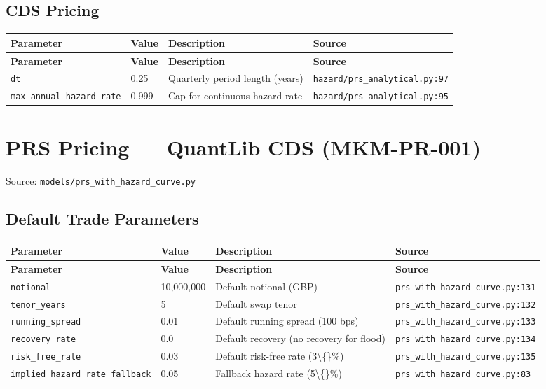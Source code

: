 \documentclass[11pt,a4paper]{article}
\begin{document}
\subsection{CDS Pricing}

\begin{longtable}{p{4cm}p{4cm}p{5.5cm}p{3.5cm}}
    \toprule
    \textbf{Parameter} & \textbf{Value} & \textbf{Description} & \textbf{Source} \\
    \midrule
    \endfirsthead
    \toprule
    \textbf{Parameter} & \textbf{Value} & \textbf{Description} & \textbf{Source} \\
    \midrule
    \endhead
    \bottomrule
    \endfoot
    \texttt{dt} & 0.25 & Quarterly period length (years) & {\scriptsize \texttt{hazard/prs\_analytical.py:97}} \\
    \texttt{max\_annual\_hazard\_rate} & 0.999 & Cap for continuous hazard rate & {\scriptsize \texttt{hazard/prs\_analytical.py:95}} \\
\end{longtable}

\clearpage

\section{PRS Pricing --- QuantLib CDS (MKM-PR-001)}

Source: \texttt{models/prs\_with\_hazard\_curve.py}

\subsection{Default Trade Parameters}

\begin{longtable}{p{4cm}p{4cm}p{5.5cm}p{3.5cm}}
    \toprule
    \textbf{Parameter} & \textbf{Value} & \textbf{Description} & \textbf{Source} \\
    \midrule
    \endfirsthead
    \toprule
    \textbf{Parameter} & \textbf{Value} & \textbf{Description} & \textbf{Source} \\
    \midrule
    \endhead
    \bottomrule
    \endfoot
    \texttt{notional} & 10,000,000 & Default notional (GBP) & {\scriptsize \texttt{prs\_with\_hazard\_curve.py:131}} \\
    \texttt{tenor\_years} & 5 & Default swap tenor & {\scriptsize \texttt{prs\_with\_hazard\_curve.py:132}} \\
    \texttt{running\_spread} & 0.01 & Default running spread (100 bps) & {\scriptsize \texttt{prs\_with\_hazard\_curve.py:133}} \\
    \texttt{recovery\_rate} & 0.0 & Default recovery (no recovery for flood) & {\scriptsize \texttt{prs\_with\_hazard\_curve.py:134}} \\
    \texttt{risk\_free\_rate} & 0.03 & Default risk-free rate (3\textbackslash\{\}\%) & {\scriptsize \texttt{prs\_with\_hazard\_curve.py:135}} \\
    \texttt{implied\_hazard\_rate fallback} & 0.05 & Fallback hazard rate (5\textbackslash\{\}\%) & {\scriptsize \texttt{prs\_with\_hazard\_curve.py:83}} \\
\end{longtable}
\end{document}
